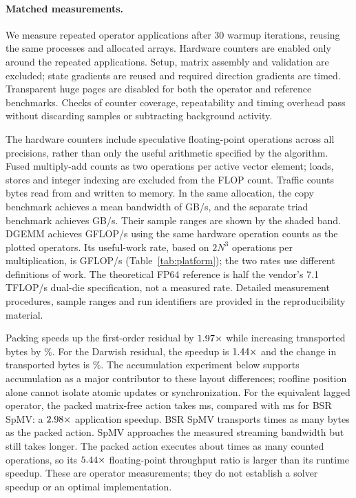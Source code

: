 \documentclass[sigconf,nonacm]{acmart}
\begin{document}
\paragraph{Matched measurements.}
We measure repeated operator applications after 30 warmup iterations,
reusing the same processes and allocated arrays. Hardware counters are enabled
only around the repeated applications. Setup, matrix assembly and validation
are excluded; state gradients are reused and required direction gradients are timed.
Transparent huge pages are disabled for both the operator and reference benchmarks.
Checks of counter coverage, repeatability and timing overhead pass without
discarding samples or subtracting background activity.

The hardware counters include speculative floating-point operations across
all precisions, rather than only the useful arithmetic specified by the algorithm.
Fused multiply-add counts as two operations per active vector element; loads,
stores and integer indexing are excluded from the FLOP count. Traffic counts
bytes read from and written to memory. In the same allocation, the copy
benchmark achieves a mean bandwidth of \rlCompCopy{} GB/s, and the separate
triad benchmark achieves \rlCompTriad{} GB/s. Their sample ranges are shown
by the shaded band. DGEMM achieves \rlCompGemm{} GFLOP/s using the same
hardware operation counts as the plotted operators. Its useful-work rate,
based on $2N^3$ operations per multiplication, is
\matchedGemmUseful{} GFLOP/s (Table~\ref{tab:platform}); the two rates use
different definitions of work. The theoretical FP64 reference is half the
vendor's 7.1 TFLOP/s dual-die specification, not a measured rate.
Detailed measurement procedures, sample ranges and run identifiers are
provided in the reproducibility material.

Packing speeds up the first-order residual by $1.97\times$
while increasing transported bytes by \matchedFoTrafficChange\%.
For the Darwish residual, the speedup is $1.44\times$
and the change in transported bytes is \matchedDarwishTrafficChange\%.
The accumulation experiment below supports accumulation as a major contributor
to these layout differences; roofline position alone cannot isolate atomic
updates or synchronization.
For the equivalent lagged operator, the packed matrix-free action takes
\rlCompLaggedTime{} ms, compared with \rlCompSpmvTime{} ms for BSR SpMV:
a $2.98\times$ application speedup. BSR SpMV transports
\matchedTrafficSpmvLagged{} times as many bytes as the packed action.
SpMV approaches the measured streaming bandwidth but still takes longer.
The packed action executes about \rlCompWorkRatio{} times as many counted
operations, so its $5.44\times$ floating-point throughput ratio
is larger than its runtime speedup. These are operator measurements; they
do not establish a solver speedup or an optimal implementation.
\end{document}
